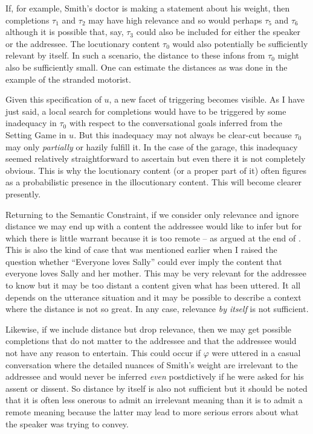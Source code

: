 If, for example, Smith's doctor is making a statement about his weight, then completions $\tau_1$ and $\tau_2$ may have high relevance and so would perhaps $\tau_5$ and $\tau_6$ although it is possible that, say, $\tau_3$ could also be included for either the speaker or the addressee. The locutionary content $\tau_0$ would also potentially be sufficiently relevant by itself. In such a scenario, the distance to these infons from $\tau_0$ might also be sufficiently small. One can estimate the distances as was done in the example of the stranded motorist. 

Given this specification of $u$, a new facet of triggering becomes visible. As I have just said, a local search for  completions would have to be triggered by some inadequacy in $\tau_0$ with respect to the conversational goals inferred from the Setting Game in $u$. But this inadequacy may not always be clear-cut because $\tau_0$ may only \emph{partially} or hazily fulfill it. In the case of the garage, this inadequacy seemed relatively straightforward to ascertain but even there it is not completely obvious. This is why the locutionary content (or a proper part of it) often figures as a probabilistic presence in the illocutionary content. This will become clearer presently.

Returning to the Semantic Constraint, if we consider only relevance and ignore distance we may end up with a content the addressee would like to infer but for which there is little warrant because it is too remote -- as argued at the end of . This is also the kind of case that was mentioned earlier when I raised the question whether ``Everyone loves Sally'' could ever imply the content that everyone loves Sally and her mother. This may be very relevant for the addressee to know but it may be too distant a content given what has been uttered. It all depends on the utterance situation and it may be possible to describe a context where the distance is not so great. In any case, relevance \emph{by itself} is not sufficient.

Likewise, if we include distance but drop relevance, then we may get possible completions that do not matter to the addressee and that the addressee would not have any reason to entertain. This could occur if $\varphi$ were uttered in a casual conversation where the detailed nuances of Smith's weight are irrelevant to the addressee and would never be inferred \emph{even} postdictively if he were asked for his assent or dissent. So distance by itself is also not sufficient but it should be noted that it is often less onerous to admit an irrelevant meaning than it is to admit a remote meaning because the latter may lead to more serious errors about what the speaker was trying to convey.

